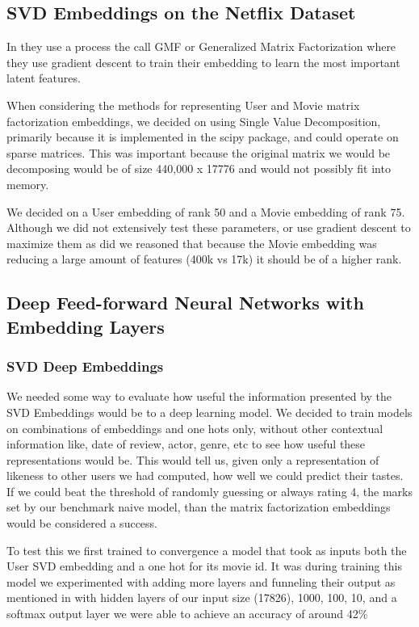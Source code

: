 \subsection{SVD Embeddings on the Netflix Dataset}

In \cite{He2017} they use a process the call GMF or Generalized Matrix Factorization where they use gradient descent to train their embedding to learn the most important latent features.

When considering the methods for representing User and Movie matrix factorization embeddings, we decided on using Single Value Decomposition, primarily because it is implemented in the scipy package, and could operate on sparse matrices. This was important because the original matrix we would be decomposing would be of size 440,000 x 17776 and would not possibly fit into memory. 

We decided on a User embedding of rank 50 and a Movie embedding of rank 75. Although we did not extensively test these parameters, or use gradient descent to maximize them as \cite{He2017} did we reasoned that because the Movie embedding was reducing a large amount of features (400k vs 17k) it should be of a higher rank. 

\subsection{Deep Feed-forward Neural Networks with Embedding Layers}

\subsubsection{SVD Deep Embeddings}
We needed some way to evaluate how useful the information presented by the SVD Embeddings would be to a deep learning model. We decided to train models on combinations of embeddings and one hots only, without other contextual information like, date of review, actor, genre, etc to see how useful these representations would be. This would tell us, given only a representation of likeness to other users we had computed, how well we could predict their tastes. If we could beat the threshold of randomly guessing or always rating 4, the marks set by our benchmark naive model, than the matrix factorization embeddings would be considered a success.

To test this we first trained to convergence a model that took as inputs both the User SVD embedding and a one hot for its movie id. It was during training this model we experimented with adding more layers and funneling their output as mentioned in \cite{He2017} with hidden layers of our input size (17826), 1000, 100, 10, and a softmax output layer we were able to achieve an accuracy of around 42\%

